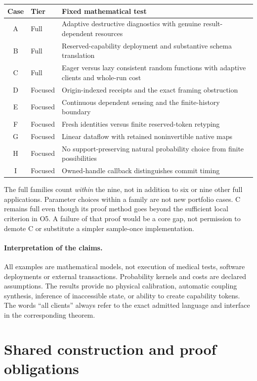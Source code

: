\documentclass[11pt,a4paper]{article}
\theoremstyle{definition}
\begin{document}
\begin{longtable}{@{}clp{.62\linewidth}@{}}
\toprule Case&Tier&Fixed mathematical test\\\midrule\endhead
A&Full&Adaptive destructive diagnostics with genuine result-dependent resources\\
B&Full&Reserved-capability deployment and substantive schema translation\\
C&Full&Eager versus lazy consistent random functions with adaptive clients and whole-run cost\\
D&Focused&Origin-indexed receipts and the exact framing obstruction\\
E&Focused&Continuous dependent sensing and the finite-history boundary\\
F&Focused&Fresh identities versus finite reserved-token retyping\\
G&Focused&Linear dataflow with retained noninvertible native maps\\
H&Focused&No support-preserving natural probability choice from finite possibilities\\
I&Focused&Owned-handle callback distinguishes commit timing\\
\bottomrule
\end{longtable}
The full families count \emph{within} the nine, not in addition to six or
nine other full applications. Parameter choices within a family are not
new portfolio cases. C remains full even though its proof method goes
beyond the sufficient local criterion in O5. A failure of that proof
would be a core gap, not permission to demote C or substitute a simpler
sample-once implementation.

\paragraph{Interpretation of the claims.}
All examples are mathematical models, not execution of medical tests,
software deployments or external transactions. Probability kernels and
costs are declared assumptions. The results provide no physical calibration,
automatic coupling synthesis, inference of inaccessible state, or ability
to create capability tokens. The words ``all clients'' always refer to
the exact admitted language and interface in the corresponding theorem.

\section{Shared construction and proof obligations}\label{sec:core}
\end{document}
